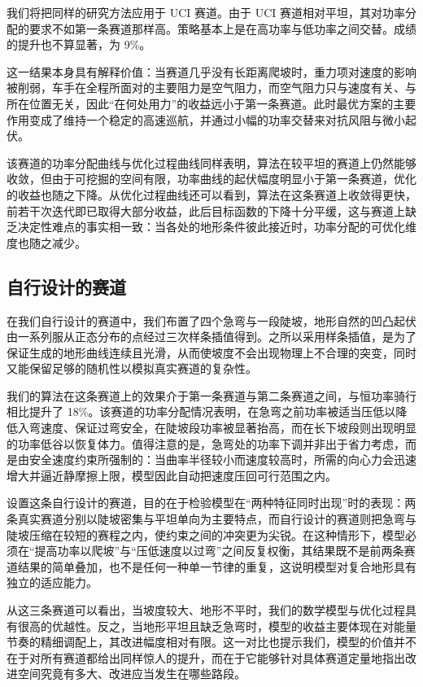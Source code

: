 \documentclass[11pt,a4paper]{ctexart}
\begin{document}
我们将把同样的研究方法应用于 UCI 赛道。由于 UCI 赛道相对平坦，其对功率分配的要求不如第一条赛道那样高。策略基本上是在高功率与低功率之间交替。成绩的提升也不算显著，为 9\%。

这一结果本身具有解释价值：当赛道几乎没有长距离爬坡时，重力项对速度的影响被削弱，车手在全程所面对的主要阻力是空气阻力，而空气阻力只与速度有关、与所在位置无关，因此“在何处用力”的收益远小于第一条赛道。此时最优方案的主要作用变成了维持一个稳定的高速巡航，并通过小幅的功率交替来对抗风阻与微小起伏。

该赛道的功率分配曲线与优化过程曲线同样表明，算法在较平坦的赛道上仍然能够收敛，但由于可挖掘的空间有限，功率曲线的起伏幅度明显小于第一条赛道，优化的收益也随之下降。从优化过程曲线还可以看到，算法在这条赛道上收敛得更快，前若干次迭代即已取得大部分收益，此后目标函数的下降十分平缓，这与赛道上缺乏决定性难点的事实相一致：当各处的地形条件彼此接近时，功率分配的可优化维度也随之减少。

\subsection{自行设计的赛道}

在我们自行设计的赛道中，我们布置了四个急弯与一段陡坡，地形自然的凹凸起伏由一系列服从正态分布的点经过三次样条插值得到。之所以采用样条插值，是为了保证生成的地形曲线连续且光滑，从而使坡度不会出现物理上不合理的突变，同时又能保留足够的随机性以模拟真实赛道的复杂性。

我们的算法在这条赛道上的效果介于第一条赛道与第二条赛道之间，与恒功率骑行相比提升了 18\%。该赛道的功率分配情况表明，在急弯之前功率被适当压低以降低入弯速度、保证过弯安全，在陡坡段功率被显著抬高，而在长下坡段则出现明显的功率低谷以恢复体力。值得注意的是，急弯处的功率下调并非出于省力考虑，而是由安全速度约束所强制的：当曲率半径较小而速度较高时，所需的向心力会迅速增大并逼近静摩擦上限，模型因此自动把速度压回可行范围之内。

设置这条自行设计的赛道，目的在于检验模型在“两种特征同时出现”时的表现：两条真实赛道分别以陡坡密集与平坦单向为主要特点，而自行设计的赛道则把急弯与陡坡压缩在较短的赛程之内，使约束之间的冲突更为尖锐。在这种情形下，模型必须在“提高功率以爬坡”与“压低速度以过弯”之间反复权衡，其结果既不是前两条赛道结果的简单叠加，也不是任何一种单一节律的重复，这说明模型对复合地形具有独立的适应能力。

从这三条赛道可以看出，当坡度较大、地形不平时，我们的数学模型与优化过程具有很高的优越性。反之，当地形平坦且缺乏急弯时，模型的收益主要体现在对能量节奏的精细调配上，其改进幅度相对有限。这一对比也提示我们，模型的价值并不在于对所有赛道都给出同样惊人的提升，而在于它能够针对具体赛道定量地指出改进空间究竟有多大、改进应当发生在哪些路段。
\end{document}
